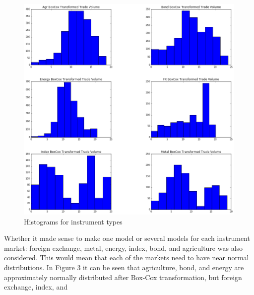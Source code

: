 \documentclass[12pt]{article}
\begin{document}
\begin{figure}[H]
	\begin{center}	
		\includegraphics[width=15cm]{types_bc_hist.png}
		\caption{Histograms for instrument types}
		\label{fig:2}
	\end{center}
\end{figure}
Whether it made sense to make one model or several models for each instrument market: foreign exchange, metal, energy, index, bond, and agriculture was also considered. This would mean that each of the markets need to have near normal distributions. In Figure 3 it can be seen that agriculture, bond, and energy are approximately normally distributed after Box-Cox transformation, but foreign exchange, index, and  
\end{document}
